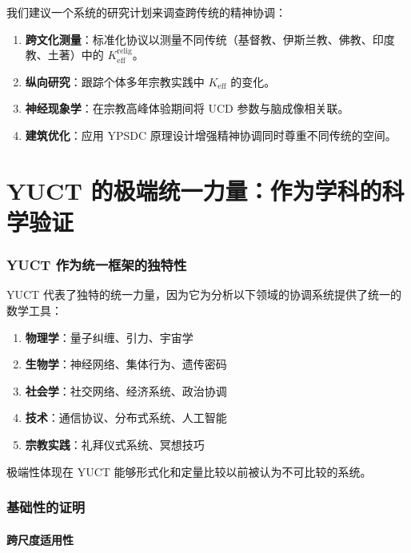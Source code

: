 \documentclass[12pt,a4paper]{article}
\begin{document}
	我们建议一个系统的研究计划来调查跨传统的精神协调：
	
	\begin{enumerate}
		\item \textbf{跨文化测量}：标准化协议以测量不同传统（基督教、伊斯兰教、佛教、印度教、土著）中的 $K_{\mathrm{eff}}^{\mathrm{relig}}$。
		
		\item \textbf{纵向研究}：跟踪个体多年宗教实践中 $K_{\mathrm{eff}}$ 的变化。
		
		\item \textbf{神经现象学}：在宗教高峰体验期间将 UCD 参数与脑成像相关联。
		
		\item \textbf{建筑优化}：应用 YPSDC 原理设计增强精神协调同时尊重不同传统的空间。
	\end{enumerate}
	
	\newpage
	\part{YUCT 的极端统一力量：作为学科的科学验证}
	
	\section{YUCT 作为统一框架的独特性}
	
	YUCT 代表了独特的统一力量，因为它为分析以下领域的协调系统提供了统一的数学工具：
	
	\begin{enumerate}
		\item \textbf{物理学}：量子纠缠、引力、宇宙学
		\item \textbf{生物学}：神经网络、集体行为、遗传密码
		\item \textbf{社会学}：社交网络、经济系统、政治协调
		\item \textbf{技术}：通信协议、分布式系统、人工智能
		\item \textbf{宗教实践}：礼拜仪式系统、冥想技巧
	\end{enumerate}
	
	极端性体现在 YUCT 能够形式化和定量比较以前被认为不可比较的系统。
	
	\section{基础性的证明}
	
	\subsection{跨尺度适用性}
	
\end{document}
